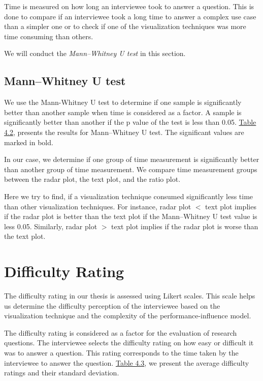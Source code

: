 Time is measured on how long an interviewee took to answer a question. This is done to compare if an interviewee took a long time to answer a complex use case than a simpler one or to check if one of the visualization techniques was more time consuming than others.

We will conduct the \textit{Mann–Whitney U test} in this section.

\subsection{Mann–Whitney U test}
We use the Mann-Whitney U test to determine if one sample is significantly better than another sample when time is considered as a factor. A sample is significantly better than another if the p value of the test is less than 0.05. \hyperref[table:time]{Table 4.2}, presents the results for Mann–Whitney U test. The significant values are marked in bold.

In our case, we determine if one group of time measurement is significantly better than another group of time measurement. We compare time measurement groups between the radar plot, the text plot, and the ratio plot. 

Here we try to find, if a visualization technique consumed significantly less time than other visualization techniques. For instance, radar plot $<$ text plot implies if the radar plot is better than the text plot if the Mann–Whitney U test value is less 0.05. Similarly, radar plot $>$ text plot implies if the radar plot is worse than the text plot. 

\section{Difficulty Rating}
\label{sec:4.3}

The difficulty rating in our thesis is assessed using Likert scales. This scale helps us determine the difficulty perception of the interviewee based on the visualization technique and the complexity of the performance-influence model.

The difficulty rating is considered as a factor for the evaluation of research questions. The interviewee selects the difficulty rating on how easy or difficult it was to answer a question. This rating corresponds to the time taken by the interviewee to answer the question. \hyperref[table:rating]{Table 4.3}, we present the average difficulty ratings and their standard deviation.

